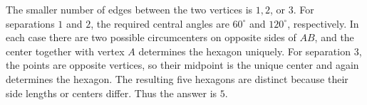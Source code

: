 The smaller number of edges between the two vertices is $1,2$, or $3$. For separations $1$ and $2$, the required central angles are $60^\circ$ and $120^\circ$, respectively. In each case there are two possible circumcenters on opposite sides of $AB$, and the center together with vertex $A$ determines the hexagon uniquely. For separation $3$, the points are opposite vertices, so their midpoint is the unique center and again determines the hexagon. The resulting five hexagons are distinct because their side lengths or centers differ. Thus the answer is $\boxed5$.
